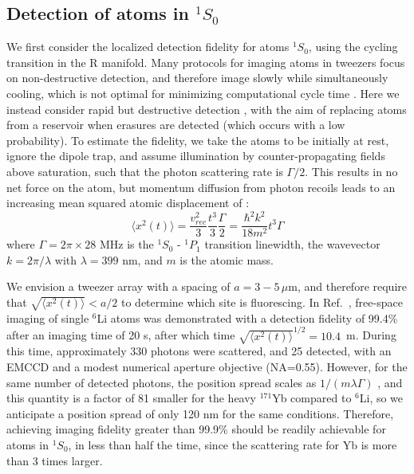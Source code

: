 \documentclass[%
reprint,
superscriptaddress,
 amsmath,amssymb,
 aps,
 prx,
floatfix,
]{revtex4-1}
\begin{document}
\subsection{Detection of atoms in $^1S_0$}
We first consider the localized detection fidelity for atoms $^1S_0$, using the cycling transition in the R manifold. Many protocols for imaging atoms in tweezers focus on non-destructive detection, and therefore image slowly while simultaneously cooling, which is not optimal for minimizing computational cycle time \cite{Saskin2019}. Here we instead consider rapid but destructive detection \cite{bergschneider2018}, with the aim of replacing atoms from a reservoir when erasures are detected (which occurs with a low probability). To estimate the fidelity, we take the atoms to be initially at rest, ignore the dipole trap, and assume illumination by counter-propagating fields above saturation, such that the photon scattering rate is $\Gamma/2$. This results in no net force on the atom, but momentum diffusion from photon recoils leads to an increasing mean squared atomic displacement of \cite{joffe1993,bergschneider2018}:
\begin{equation}
\langle x^2(t) \rangle  = \frac{v_{rec}^2}{3} \frac{t^3}{3} \frac{\Gamma}{2} = \frac{\hbar^2 k^2}{18 m^2} t^3 \Gamma
\end{equation}
where $\Gamma = 2\pi \times 28$ MHz is the $^1S_0$ - $^1P_1$ transition linewidth, the wavevector $k=2\pi/\lambda$ with $\lambda=399$ nm, and $m$ is the atomic mass.

We envision a tweezer array with a spacing of $a=3-5\,\mu$m, and therefore require that $\sqrt{\langle x^2(t) \rangle} < a/2$ to determine which site is fluorescing. In Ref.~\cite{bergschneider2018}, free-space imaging of single ${}^{6}$Li atoms was demonstrated with a detection fidelity of 99.4\% after an imaging time of 20 \textmu s, after which time $\sqrt{\langle x^2(t) \rangle}^{1/2} = 10.4$~\textmu m. During this time, approximately 330 photons were scattered, and 25 detected, with an EMCCD and a modest numerical aperture objective (NA=0.55). However, for the same number of detected photons, the position spread scales as $1/(m \lambda \Gamma)$ \cite{bergschneider2018}, and this quantity is a factor of 81 smaller for the heavy ${}^{171}$Yb compared to ${}^{6}$Li, so we anticipate a position spread of only 120 nm for the same conditions. Therefore, achieving imaging fidelity greater than 99.9\% should be readily achievable for atoms in ${}^{1}S_0$, in less than half the time, since the scattering rate for Yb is more than 3 times larger.
\end{document}
